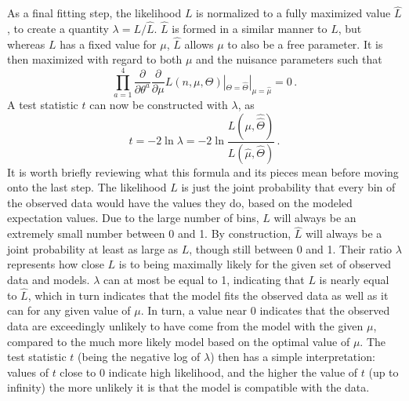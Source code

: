     As a final fitting step, the likelihood $L$ is normalized to a fully maximized value $\hat L$,
        to create a quantity $\lambda = L / \hat L$.
    $\hat L$ is formed in a similar manner to $L$, but whereas $L$ has a fixed value for $\mu$,
        $\hat L$ allows $\mu$ to also be a free parameter.
    It is then maximized with regard to both $\mu$ and the nuisance parameters such that
    \begin{equation}
        \prod \limits_{a=1}^{4} \frac{\partial}{\partial \theta^a} \frac{\partial}{\partial \mu} L(n,\mu,\Theta) |_{\Theta=\hat \Theta} |_{\mu=\hat \mu} = 0
        \,.
    \end{equation}
    A test statistic $t$ can now be constructed with $\lambda$, as
    \begin{equation}
        t = -2 \ln{\lambda} = -2 \ln{\frac{L(\mu, \hat {\hat \Theta})}{L(\hat \mu, \hat \Theta)}}
        \,.
    \end{equation}
    It is worth briefly reviewing what this formula and its pieces mean before moving onto the last step.
    The likelihood $L$ is just the joint probability that every bin of the observed data would have the values they do,
        based on the modeled expectation values.
    Due to the large number of bins, $L$ will always be an extremely small number between 0 and 1.
    By construction, $\hat L$ will always be a joint probability at least as large as $L$, though still between 0 and 1.
    Their ratio $\lambda$ represents how close $L$ is to being maximally likely for the given set of observed data and models.
    $\lambda$ can at most be equal to 1, indicating that $L$ is nearly equal to $\hat L$,
        which in turn indicates that the model fits the observed data as well as it can for any given value of $\mu$.
    In turn, a value near 0 indicates that the observed data are exceedingly unlikely to have come from the model with the given $\mu$,
        compared to the much more likely model based on the optimal value of $\mu$.
    The test statistic $t$ (being the negative log of $\lambda$) then has a simple interpretation:
        values of $t$ close to 0 indicate high likelihood,
        and the higher the value of $t$ (up to infinity) the more unlikely it is that the model is compatible with the data.

